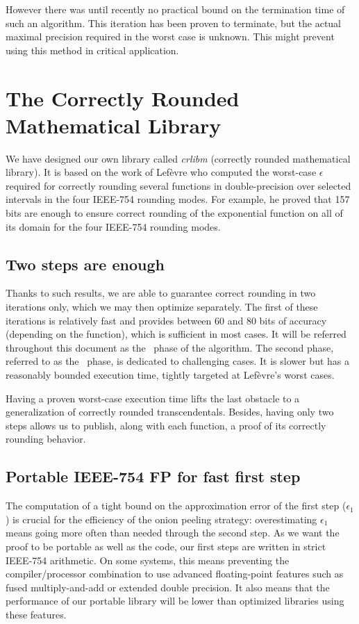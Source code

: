 However there was until recently no practical bound on the termination
time of such an algorithm. This iteration has been proven to
terminate, but the actual maximal precision required in the worst case
is unknown.  This might prevent using this method in critical
application.




\section{The Correctly Rounded Mathematical Library}
\label{section:crlibm}

We have designed our own library called \emph{crlibm} (correctly
rounded mathematical library). It is based on the work of
Lef\`evre\cite{LMT98,Lef2000} who computed the worst-case $\epsilon$
required for correctly rounding several functions in double-precision
over selected intervals in the four IEEE-754 rounding modes. For
example, he proved that 157 bits are enough to ensure correct rounding
of the exponential function on all of its domain for the four IEEE-754
rounding modes.

\subsection{Two steps are enough}
Thanks to such results, we are able to guarantee correct rounding in
two iterations only, which we may then optimize separately. The first
of these iterations is relatively fast and provides between 60 and 80
bits of accuracy (depending on the function), which is sufficient in
most cases. It will be referred throughout this document as the \quick\ 
phase of the algorithm. The second phase, referred to as the
\accurate\ phase, is dedicated to challenging cases. It is slower but
has a reasonably bounded execution time, tightly targeted at
Lef\`evre's worst cases.

Having a proven worst-case execution time lifts the last obstacle to a
generalization of correctly rounded transcendentals. Besides, having
only two steps allows us to publish, along with each function, a proof
of its correctly rounding behavior.


\subsection{Portable IEEE-754 FP for fast first step}
The computation of a tight bound on the approximation error of the
first step ($\epsilon_1$) is crucial for the efficiency of the onion
peeling strategy: overestimating $\epsilon_1$ means going more often
than needed through the second step. As we want the proof to be
portable as well as the code, our first steps are written in strict
IEEE-754 arithmetic. On some systems, this means preventing the
compiler/processor combination to use advanced floating-point features
such as fused multiply-and-add or extended double precision. It also
means that the performance of our portable library will be lower than
optimized libraries using these features.

